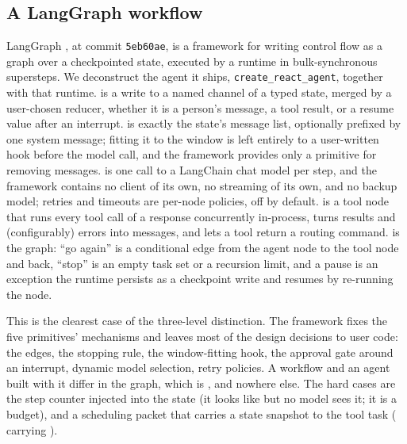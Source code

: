 \subsection{A LangGraph workflow}
LangGraph \citep{langgraph}, at commit \texttt{5eb60ae}, is a framework for writing control flow as a graph over a checkpointed state, executed by a runtime in bulk-synchronous supersteps. We deconstruct the agent it ships, \texttt{create\_react\_agent}, together with that runtime.  is a write to a named channel of a typed state, merged by a user-chosen reducer, whether it is a person's message, a tool result, or a resume value after an interrupt.  is exactly the state's message list, optionally prefixed by one system message; fitting it to the window is left entirely to a user-written hook before the model call, and the framework provides only a primitive for removing messages.  is one call to a LangChain chat model per step, and the framework contains no client of its own, no streaming of its own, and no backup model; retries and timeouts are per-node policies, off by default.  is a tool node that runs every tool call of a response concurrently in-process, turns results and (configurably) errors into messages, and lets a tool return a routing command.  is the graph: ``go again'' is a conditional edge from the agent node to the tool node and back, ``stop'' is an empty task set or a recursion limit, and a pause is an exception the runtime persists as a checkpoint write and resumes by re-running the node.

This is the clearest case of the three-level distinction. The framework fixes the five primitives' mechanisms and leaves most of the design decisions to user code: the edges, the stopping rule, the window-fitting hook, the approval gate around an interrupt, dynamic model selection, retry policies. A workflow and an agent built with it differ in the graph, which is , and nowhere else. The hard cases are the step counter injected into the state (it looks like  but no model sees it; it is a  budget), and a scheduling packet that carries a state snapshot to the tool task ( carrying ).

